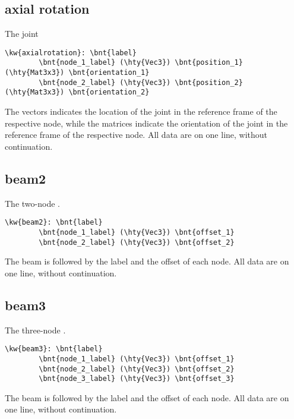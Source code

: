 \subsection{axial rotation}
The  joint
\begin{Verbatim}[commandchars=\\\{\}]
    \kw{axialrotation}: \bnt{label}
        \bnt{node_1_label} (\hty{Vec3}) \bnt{position_1} (\hty{Mat3x3}) \bnt{orientation_1}
        \bnt{node_2_label} (\hty{Vec3}) \bnt{position_2} (\hty{Mat3x3}) \bnt{orientation_2}
\end{Verbatim}
The  vectors indicates the location of the joint
in the reference frame of the respective node,
while the  matrices indicate the orientation of the joint
in the reference frame of the respective node.
All data are on one line, without continuation.

\subsection{beam2}
The two-node .
\begin{Verbatim}[commandchars=\\\{\}]
    \kw{beam2}: \bnt{label}
        \bnt{node_1_label} (\hty{Vec3}) \bnt{offset_1}
        \bnt{node_2_label} (\hty{Vec3}) \bnt{offset_2}
\end{Verbatim}
The beam  is followed by the label and the offset of each node.
All data are on one line, without continuation.

\subsection{beam3}
The three-node .
\begin{Verbatim}[commandchars=\\\{\}]
    \kw{beam3}: \bnt{label}
        \bnt{node_1_label} (\hty{Vec3}) \bnt{offset_1}
        \bnt{node_2_label} (\hty{Vec3}) \bnt{offset_2}
        \bnt{node_3_label} (\hty{Vec3}) \bnt{offset_3}
\end{Verbatim}
The beam  is followed by the label and the offset of each node.
All data are on one line, without continuation.

